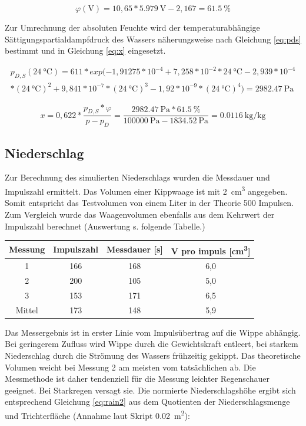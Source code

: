 \begin{equation}
	\label{eq:cal}
	\varphi(\text{V})=10,65*\SI{5,979}{\volt}-2,167=\SI{61,5}{\percent}
\end{equation}

Zur Umrechnung der absoluten Feuchte wird der temperaturabhängige Sättigungspartialdampfdruck des Wassers näherungsweise nach Gleichung \ref{eq:pds} bestimmt und in Gleichung \ref{eq:x} eingesetzt. 

\begin{multline}
	\label{eq:pds}
	p_{D,S}(\SI{24}{\celsius}) = 611*exp(-1,91275*10^{-4}+7,258*10^{-2}*\SI{24}{\celsius}-2,939*10^{-4}\\*(\SI{24}{\celsius})^2 +9,841*10^{-7}*(\SI{24}{\celsius})^3-1,92*10^{-9}*(\SI{24}{\celsius})^4)=\SI{2982,47}{\pascal}
\end{multline}

\begin{equation}
	\label{eq:x}
	x=0,622*\frac{p_{D,S}*\varphi}{p-p_D}=\frac{\SI{2982,47}{\pascal}*\SI{61,5}{\percent}}{\SI{100000}{\pascal}-\SI{1834,52}{\pascal}}=\SI{0,0116}{\kilogram\per\kilogram}
\end{equation}

		
\subsection{Niederschlag}
Zur Berechnung des simulierten Niederschlags wurden die Messdauer und Impulszahl ermittelt. Das Volumen einer Kippwaage ist mit \SI{2}{\cubic\centi\meter} angegeben. Somit entspricht das Testvolumen von einem Liter in der Theorie 500 Impulsen. Zum Vergleich wurde das Waagenvolumen ebenfalls aus dem Kehrwert der Impulszahl berechnet (Auswertung s. folgende Tabelle.)

 \begin{center}
 	\begin{tabular}{c|c|c|c}
 		\label{tab:rain}
 		\textbf{Messung} & \textbf{Impulszahl} & \textbf{Messdauer} [s] & \textbf{V pro impuls} [\si{\cubic\centi\meter}]\\
 		\hline
 		1 & 166 & 168  & 6,0\\
 		2 & 200 & 105  & 5,0\\
 		3 & 153 & 171  & 6,5\\
 		Mittel & 173 & 148  & 5,9
 	\end{tabular}
 \end{center}

Das Messergebnis ist in erster Linie vom Impulsübertrag auf die Wippe abhängig. Bei geringerem Zufluss wird Wippe durch die Gewichtskraft entleert, bei starkem Niederschlag durch die Strömung des Wassers frühzeitig gekippt. Das theoretische Volumen weicht bei Messung 2 am meisten vom tatsächlichen ab. Die Messmethode ist daher tendenziell für die Messung leichter Regenschauer geeignet. Bei Starkregen versagt sie. 
Die normierte Niederschlagshöhe ergibt sich entsprechend Gleichung \ref{eq:rain2} aus dem Quotienten der Niederschlagsmenge und Trichterfläche (Annahme laut Skript \SI{0,02}{\square\meter}):


